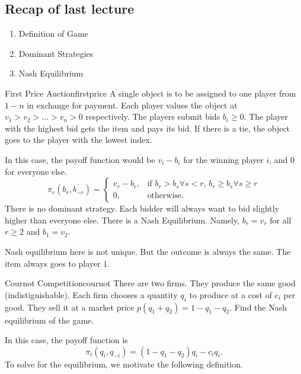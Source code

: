 \newsection
\subsection*{Recap of last lecture}
\begin{enumerate}
    \item Definition of Game
    \item Dominant Strategies
    \item Nash Equilibrium
\end{enumerate}

\begin{aexample}{First Price Auction}{firstprice}
    A single object is to be assigned to one player from $1-n$ in exchange for payment.
    Each player values the object at $v_1>v_2>\ldots>v_n>0$ respectively.
    The players submit bids $b_i\geq 0$. The player with the highest bid gets the item and pays its bid. If there is a tie, the object goes to the player with the lowest index.
\end{aexample}

In this case, the payoff function would be $v_i-b_i$ for the winning player $i$, and $0$ for everyone else.
\[
\pi_r(b_r,\overline{b_{-r}})=\begin{cases}
    v_r-b_r, & \textrm{if $b_r>b_s\forall s<r$, $b_r\geq b_s \forall s\geq r$}\\
    0, & \textrm{otherwise.}
\end{cases}
\]
There is no dominant strategy. Each bidder will always want to bid slightly higher than everyone else. There is a Nash Equilibrium. Namely, $b_r=v_r$ for all $r\geq 2$ and $b_1=v_2$. 
\begin{remark}
    Nash equilibrium here is not unique. But the outcome is always the same. The item always goes to player $1$.
\end{remark}
\begin{aexample}{Cournot Competition}{cournot}
    There are two firms. They produce the same good (indistiguishable). Each firm chooses a quantity $q_{i}$ to produce at a cost of $c_i$ per good. They sell it at a market price $p(q_1+q_2)=1-q_1-q_2.$ Find the Nash equilibrium of the game.
\end{aexample}
In this case, the payoff function is \[
\pi_i(q_i,q_{-i})=(1-q_1-q_2)q_i-c_i q_i.
\]
To solve for the equilibrium, we motivate the following definition.

